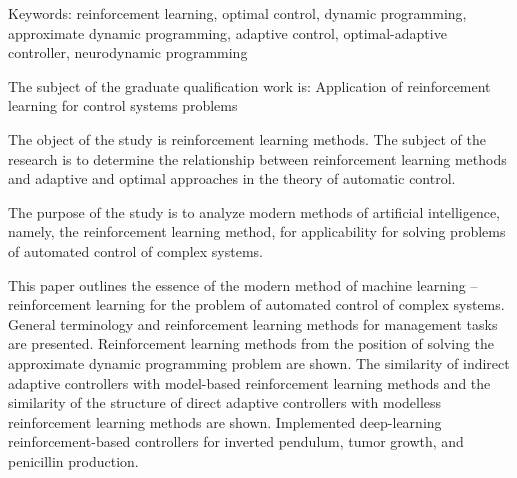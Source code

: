 \newpage
\printTheAbstract %

Keywords: reinforcement learning, optimal control, dynamic programming, approximate dynamic programming, adaptive control, optimal-adaptive controller, neurodynamic programming


The subject of the graduate qualification work is: Application of reinforcement learning for control systems problems

The object of the study is reinforcement learning methods. The subject of the research is to determine the relationship between reinforcement learning methods and adaptive and optimal approaches in the theory of automatic control.

The purpose of the study is to analyze modern methods of artificial intelligence, namely, the reinforcement learning method, for applicability for solving problems of automated control of complex systems.

This paper outlines the essence of the modern method of machine learning -- reinforcement learning for the problem of automated control of complex systems. General terminology and reinforcement learning methods for management tasks are presented. Reinforcement learning methods from the position of solving the approximate dynamic programming problem are shown. The similarity of indirect adaptive controllers with model-based reinforcement learning methods and the similarity of the structure of direct adaptive controllers with modelless reinforcement learning methods are shown. Implemented deep-learning reinforcement-based controllers for inverted pendulum, tumor growth, and penicillin production.
	


\thispagestyle{empty}
%
